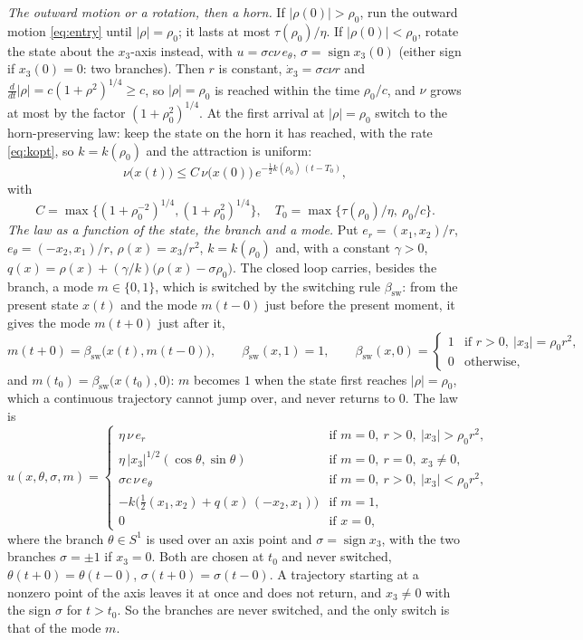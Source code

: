 \documentclass[11pt,reqno]{amsart}
\theoremstyle{plain}
\theoremstyle{definition}
\theoremstyle{remark}
\begin{document}
\emph{The outward motion or a rotation, then a horn.} If $|\rho(0)|>\rho_0$, run the outward motion
\eqref{eq:entry} until $|\rho|=\rho_0$; it lasts at most $\tau(\rho_0)/\eta$. If $|\rho(0)|<\rho_0$, rotate the
state about the $x_3$-axis instead, with $u=\sigma c\nu\,e_\theta$, $\sigma=\operatorname{sign}x_3(0)$ (either sign if
$x_3(0)=0$: two branches). Then $r$ is constant, $\dot x_3=\sigma c\nu r$ and
$\frac{d}{dt}|\rho|=c(1+\rho^{2})^{1/4}\ge c$, so $|\rho|=\rho_0$ is reached within the time $\rho_0/c$, and $\nu$
grows at most by the factor $(1+\rho_0^{2})^{1/4}$. At the first arrival at $|\rho|=\rho_0$ switch to the horn-preserving law: keep the state on the horn it has
reached, with
the rate \eqref{eq:kopt}, so $k=k(\rho_0)$ and the attraction is uniform:
\[
  \nu\bigl(x(t)\bigr)\le C\,\nu\bigl(x(0)\bigr)\,e^{-\frac12k(\rho_0)\,(t-T_0)},
\]
with
\[
  C=\max\bigl\{(1+\rho_0^{-2})^{1/4},(1+\rho_0^{2})^{1/4}\bigr\},\quad
  T_0=\max\bigl\{\tau(\rho_0)/\eta,\ \rho_0/c\bigr\}.
\]
\emph{The law as a function of the state, the branch and a mode.} Put $e_r=(x_1,x_2)/r$,
$e_\theta=(-x_2,x_1)/r$, $\rho(x)=x_3/r^{2}$, $k=k(\rho_0)$ and, with a constant $\gamma>0$,
$q(x)=\rho(x)+(\gamma/k)\bigl(\rho(x)-\sigma\rho_0\bigr)$. The closed loop carries, besides the branch, a
mode $m\in\{0,1\}$, which is switched by the switching rule $\beta_{\mathrm{sw}}$: from the present state
$x(t)$ and the mode $m(t-0)$ just before the present moment, it gives the mode $m(t+0)$ just after it,
\[
  m(t+0)=\beta_{\mathrm{sw}}\bigl(x(t),m(t-0)\bigr),\qquad \beta_{\mathrm{sw}}(x,1)=1,\qquad
  \beta_{\mathrm{sw}}(x,0)=\begin{cases}1&\text{if } r>0,\ |x_3|=\rho_0r^{2},\\ 0&\text{otherwise},\end{cases}
\]
and $m(t_0)=\beta_{\mathrm{sw}}\bigl(x(t_0),0\bigr)$: $m$ becomes $1$ when the state first reaches $|\rho|=\rho_0$, which a
continuous trajectory cannot jump over, and never returns to $0$. The law is
\[
  u(x,\theta,\sigma,m)=\begin{cases}
    \eta\,\nu\,e_r & \text{if } m=0,\ r>0,\ |x_3|>\rho_0r^{2},\\[0.5ex]
    \eta\,|x_3|^{1/2}(\cos\theta,\sin\theta) & \text{if } m=0,\ r=0,\ x_3\neq0,\\[0.5ex]
    \sigma c\,\nu\,e_\theta & \text{if } m=0,\ r>0,\ |x_3|<\rho_0r^{2},\\[0.5ex]
    -k\bigl(\tfrac12(x_1,x_2)+q(x)\,(-x_2,x_1)\bigr) & \text{if } m=1,\\[0.5ex]
    0 & \text{if } x=0,
  \end{cases}
\]
where the branch $\theta\in S^{1}$ is used over an axis point and $\sigma=\operatorname{sign}x_3$, with the two
branches $\sigma=\pm1$ if $x_3=0$. Both are chosen at $t_0$ and never switched, $\theta(t+0)=\theta(t-0)$,
$\sigma(t+0)=\sigma(t-0)$. A trajectory starting at a nonzero point of the axis leaves it at once and does not return, and $x_3\neq0$
with the sign $\sigma$ for $t>t_0$. So the branches are never switched, and the only switch is that of the mode $m$.
\end{document}
